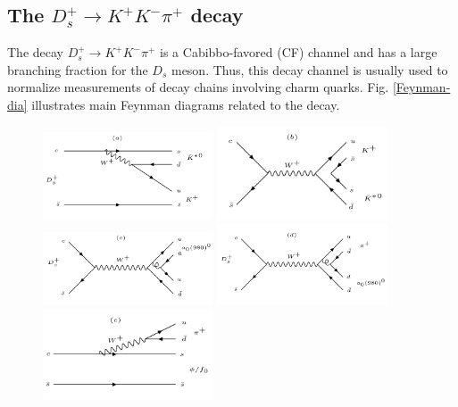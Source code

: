 \subsection{The $D_{s}^{+} \rightarrow K^{+}K^{-}\pi^{+}$ decay}
\par{

    The decay $D_{s}^{+} \rightarrow K^{+}K^{-}\pi^{+}$ is a Cabibbo-favored (CF) channel and has a large branching fraction for the $D_{s}$ meson.
    Thus, this decay channel is usually used to normalize measurements of decay chains involving charm quarks.
    Fig. \ref{Feynman-dia} illustrates main Feynman diagrams related to the decay.
    \begin{figure}[h]
        \centering
        \includegraphics[width=0.45\textwidth]{plot/Fa.PNG}
        \includegraphics[width=0.45\textwidth]{plot/Fb.PNG}
        \includegraphics[width=0.45\textwidth]{plot/Fc.PNG}
        \includegraphics[width=0.45\textwidth]{plot/Fd.PNG}
        \includegraphics[width=0.45\textwidth]{plot/Fe.PNG}

\end{figure}}
